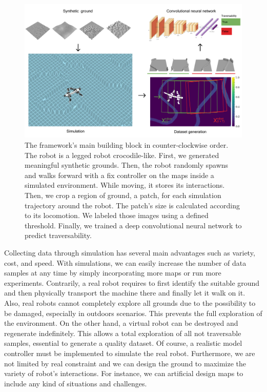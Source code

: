 \documentclass[../document.tex]{subfiles}
\begin{document}
\begin{figure} [htbp]
    \centering
        \includegraphics[width=\textwidth]{../img/method.png}
    \caption{The framework's main building block in counter-clockwise order. The robot is a legged robot crocodile-like. First, we generated meaningful synthetic grounds. Then, the robot randomly spawns and walks forward with a fix controller on the maps inside a simulated environment. While moving, it stores its interactions. Then, we crop a region of ground, a patch, for each simulation trajectory around the robot. The patch's size is calculated according to its locomotion. We labeled those images using a defined threshold. Finally, we trained a deep convolutional neural network to predict traversability. }
    \label{fig : pipeline}
    \end{figure}
Collecting data through simulation has several main advantages such as variety, cost, and speed. With simulations, we can easily increase the number of data samples at any time by simply incorporating more maps or run more experiments. Contrarily, a real robot requires to first identify the suitable ground and then physically transport the machine there and finally let it walk on it. Also, real robots cannot completely explore all grounds due to the possibility to be damaged, especially in outdoors scenarios. This prevents the full exploration of the environment. On the other hand, a virtual robot can be destroyed and regenerate indefinitely. This allows a total exploration of all not traversable samples, essential to generate a quality dataset. Of course, a realistic model controller must be implemented to simulate the real robot. Furthermore, we are not limited by real constraint and we can design the ground to maximize the variety of robot's interactions. For instance, we can artificial design maps to include any kind of situations and challenges.
\end{document}
